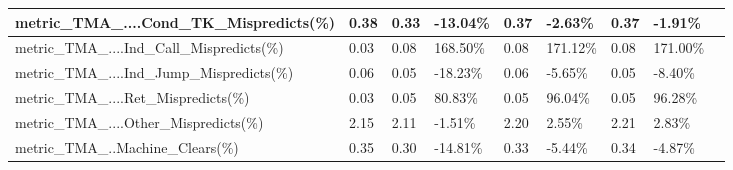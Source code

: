 \documentclass[12pt]{article}
\begin{document}
\begin{longtable}{|m{139.55pt}|m{40.35pt}|m{36.25pt}|m{36.25pt}|m{36.25pt}|m{42.10pt}|m{30.30pt}|m{44.65pt}|@{}m{0pt}@{}}
\raggedright\arraybackslash{}metric\_\allowbreak{}TMA\_\allowbreak{}....Cond\_\allowbreak{}TK\_\allowbreak{}Mispredicts(\%) & \centering\arraybackslash{}0.38 & \centering\arraybackslash{}0.33 & \cellcolor[HTML]{D9D9D9}\centering\arraybackslash{}-13.04\% & \centering\arraybackslash{}0.37 & \cellcolor[HTML]{D9D9D9}\centering\arraybackslash{}-2.63\% & \centering\arraybackslash{}0.37 & \cellcolor[HTML]{D9D9D9}\centering\arraybackslash{}-1.91\% & \rule[-0.00pt]{0pt}{14.40pt} \\ \hline
\raggedright\arraybackslash{}metric\_\allowbreak{}TMA\_\allowbreak{}....Ind\_\allowbreak{}Call\_\allowbreak{}Mispredicts(\%) & \centering\arraybackslash{}0.03 & \centering\arraybackslash{}0.08 & \cellcolor[HTML]{D9D9D9}\centering\arraybackslash{}168.50\% & \centering\arraybackslash{}0.08 & \cellcolor[HTML]{D9D9D9}\centering\arraybackslash{}171.12\% & \centering\arraybackslash{}0.08 & \cellcolor[HTML]{D9D9D9}\centering\arraybackslash{}171.00\% & \rule[-0.00pt]{0pt}{14.40pt} \\ \hline
\raggedright\arraybackslash{}metric\_\allowbreak{}TMA\_\allowbreak{}....Ind\_\allowbreak{}Jump\_\allowbreak{}Mispredicts(\%) & \centering\arraybackslash{}0.06 & \centering\arraybackslash{}0.05 & \cellcolor[HTML]{D9D9D9}\centering\arraybackslash{}-18.23\% & \centering\arraybackslash{}0.06 & \cellcolor[HTML]{D9D9D9}\centering\arraybackslash{}-5.65\% & \centering\arraybackslash{}0.05 & \cellcolor[HTML]{D9D9D9}\centering\arraybackslash{}-8.40\% & \rule[-0.00pt]{0pt}{14.40pt} \\ \hline
\raggedright\arraybackslash{}metric\_\allowbreak{}TMA\_\allowbreak{}....Ret\_\allowbreak{}Mispredicts(\%) & \centering\arraybackslash{}0.03 & \centering\arraybackslash{}0.05 & \cellcolor[HTML]{D9D9D9}\centering\arraybackslash{}80.83\% & \centering\arraybackslash{}0.05 & \cellcolor[HTML]{D9D9D9}\centering\arraybackslash{}96.04\% & \centering\arraybackslash{}0.05 & \cellcolor[HTML]{D9D9D9}\centering\arraybackslash{}96.28\% & \rule[-0.00pt]{0pt}{14.40pt} \\ \hline
\raggedright\arraybackslash{}metric\_\allowbreak{}TMA\_\allowbreak{}....Other\_\allowbreak{}Mispredicts(\%) & \centering\arraybackslash{}2.15 & \centering\arraybackslash{}2.11 & \cellcolor[HTML]{D9D9D9}\centering\arraybackslash{}-1.51\% & \centering\arraybackslash{}2.20 & \cellcolor[HTML]{D9D9D9}\centering\arraybackslash{}2.55\% & \centering\arraybackslash{}2.21 & \cellcolor[HTML]{D9D9D9}\centering\arraybackslash{}2.83\% & \rule[-0.00pt]{0pt}{14.40pt} \\ \hline
\raggedright\arraybackslash{}metric\_\allowbreak{}TMA\_\allowbreak{}..Machine\_\allowbreak{}Clears(\%) & \centering\arraybackslash{}0.35 & \centering\arraybackslash{}0.30 & \cellcolor[HTML]{D9D9D9}\centering\arraybackslash{}-14.81\% & \centering\arraybackslash{}0.33 & \cellcolor[HTML]{D9D9D9}\centering\arraybackslash{}-5.44\% & \centering\arraybackslash{}0.34 & \cellcolor[HTML]{D9D9D9}\centering\arraybackslash{}-4.87\% & \rule[-0.00pt]{0pt}{14.40pt} \\ \hline

\end{longtable}
\end{document}
